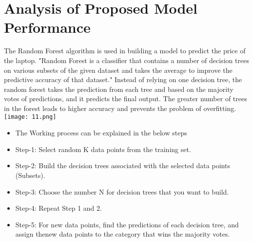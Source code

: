 \documentclass[
11pt, %
english, %
singlespacing, %
headsepline, %
]{MastersDoctoralThesis} %
\begin{document}
\chapter{Analysis of Proposed Model Performance}
The Random Forest algorithm is used in building a
model to predict the price of the laptop.
"Random Forest is a classifier that contains a number
of decision trees on various subsets of the given dataset 
and takes the average to improve the predictive 
accuracy of that dataset." Instead of relying on one 
decision tree, the random forest takes the prediction
from each tree and based on the majority votes of
predictions, and it predicts the final output.
The greater number of trees in the forest leads to
higher accuracy and prevents the problem of
overfitting.\hfill\break\break\break
    \vspace{2cm}
    \texttt{[image: 11.png]}
\break\break\break
\begin{itemize}
    \item The Working process can be explained in the below
steps
\item Step-1: Select random K data points from the training
set.
\item Step-2: Build the decision trees associated with the
selected data points (Subsets).
\item Step-3: Choose the number N for decision trees that
you want to build.
\item Step-4: Repeat Step 1 and 2.
\item Step-5: For new data points, find the predictions of
each decision tree, and assign thenew data points to 
the category that wins the majority votes.
\end{itemize}
\end{document}
